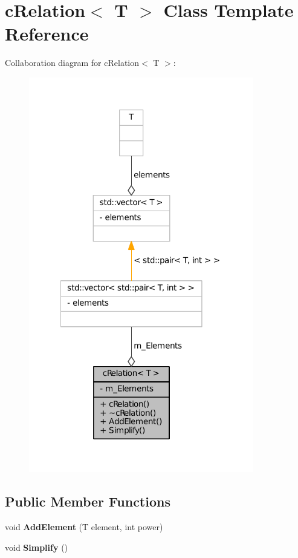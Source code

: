 \hypertarget{classcRelation}{
\section{c\-Relation$<$ \-T $>$ \-Class \-Template \-Reference}
\label{classcRelation}
}


\-Collaboration diagram for c\-Relation$<$ \-T $>$\-:
\nopagebreak
\begin{figure}[H]
\begin{center}
\leavevmode
\includegraphics[width=278pt]{classcRelation__coll__graph}
\end{center}
\end{figure}
\subsection*{\-Public \-Member \-Functions}
\begin{DoxyCompactItemize}
\item 
\hypertarget{classcRelation_ae29c097881f75764bdb12aba1ad74ce8}{
void {\bfseries \-Add\-Element} (\-T element, int power)}
\label{classcRelation_ae29c097881f75764bdb12aba1ad74ce8}

\item 
\hypertarget{classcRelation_ad0c0669a809d296127a5803faf2effa3}{
void {\bfseries \-Simplify} ()}
\label{classcRelation_ad0c0669a809d296127a5803faf2effa3}

\end{DoxyCompactItemize}
